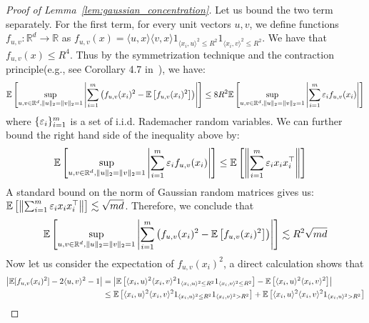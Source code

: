 \begin{proof}[Proof of Lemma~\ref{lem:gaussian_concentration}]
 
Let us bound the two term separately. For the first term, for every unit vectors $u, v$, we define functions $f_{u, v}: \mathbb{R}^d \to \mathbb{R}$ as $f_{u, v}(x) = \langle  u, x \rangle \langle v, x \rangle  1_{\langle x_i,u  \rangle^2 \leq R^2} 1_{\langle x_i,v  \rangle^2 \leq R^2 }$. We have that $f_{u, v}(x) \leq R^4$. Thus by the symmetrization technique and the contraction principle(e.g.,  see Corollary 4.7 in~\cite{adamczak2010quantitative}), we have:
\begin{align}
\mathbb{E}\left[ \sup_{u, v \in \mathbb{R}^d, \| u \|_2=  \| v\|_2 = 1} \left| \sum_{i  = 1}^m \left(f_{u, v}(x_i)^2 - \mathbb{E}\left[f_{u, v}(x_i)^2\right] \right) \right|\right] \leq 8R^2\mathbb{E}\left[  \sup_{u, v \in \mathbb{R}^d, \| u \|_2=  \| v\|_2 = 1} \left| \sum_{i = 1}^m \varepsilon_i f_{u, v}(x_i)\right| \right]\nonumber
\end{align}
 where $\{\varepsilon_i\}_{i = 1}^m$ is a set of i.i.d.  Rademacher random variables.  We can further bound the right hand side of the inequality above by:
 \begin{align}
 \mathbb{E}\left[  \sup_{u, v \in \mathbb{R}^d, \| u \|_2=  \| v\|_2 = 1} \left| \sum_{i = 1}^m \varepsilon_i f_{u, v}(x_i)\right| \right] &\leq \mathbb{E}\left[  \left\|\sum_{i = 1}^m \varepsilon_i x_i x_i^{\top}\right\|\right]\nonumber
 \end{align}
 A standard bound on the norm of Gaussian random matrices gives us: $\mathbb{E}\left[  \left\|\sum_{i = 1}^m \varepsilon_i x_i x_i^{\top}\right\|\right] \lesssim \sqrt{md}$. Therefore, we conclude that 
 \begin{align}
 \mathbb{E}\left[ \sup_{u, v \in \mathbb{R}^d, \| u \|_2=  \| v\|_2 = 1} \left| \sum_{i  = 1}^m \left(f_{u, v}(x_i)^2 - \mathbb{E}\left[f_{u, v}(x_i)^2 \right] \right) \right|\right]  \lesssim R^2 \sqrt{md}\nonumber
 \end{align}
 Now let us consider the expectation of $f_{u, v}(x_i)^2$, a direct calculation shows that 
 \begin{align}
\left| \E[f_{u, v}(x_i)^2]  - 2\langle u, v \rangle^2 - 1 \right| &=\left| \E\left[\langle x_i, u \rangle^2 \langle x_i , v \rangle^2 1_{\langle x_i,u  \rangle^2 \leq R^2 } 1_{\langle x_i,v  \rangle^2 \leq R^2 }\right] - \E\left[\langle x_i, u \rangle^2 \langle x_i , v \rangle^2  \right]\right|\nonumber
\\
& \leq \E\left[\langle x_i, u \rangle^2 \langle x_i , v \rangle^2 1_{\langle x_i,u  \rangle^2 \leq R^2 } 1_{\langle x_i,v  \rangle^2 > R^2 }\right]\nonumber
+ \E\left[\langle x_i, u \rangle^2 \langle x_i , v \rangle^2 1_{\langle x_i,u  \rangle^2 > R^2 } \right]\nonumber
\\

\end{align}
\end{proof}
